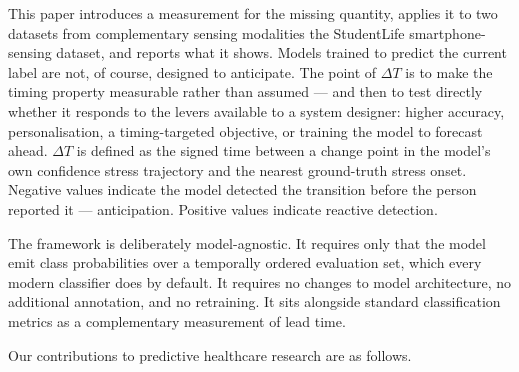 \documentclass[preprint,12pt,authoryear]{elsarticle}
\newcommand{\dt}{$\Delta T$}
\providecommand{\DIFaddtex}[1]{{\protect\color{blue} \sf #1}} %
\providecommand{\DIFdeltex}[1]{{\protect\color{red} \scriptsize #1}} %
\providecommand{\DIFaddbegin}{} %
\providecommand{\DIFaddend}{} %
\providecommand{\DIFdelbegin}{} %
\providecommand{\DIFdelend}{} %
\providecommand{\DIFadd}[1]{\texorpdfstring{\DIFaddtex{#1}}{#1}} %
\providecommand{\DIFdel}[1]{\texorpdfstring{\DIFdeltex{#1}}{}} %
\newcommand{\DIFscaledelfig}{0.5}
\newlength{\DIFdelgraphicswidth} %
\newlength{\DIFdelgraphicsheight} %
\newcommand{\DIFaddincludegraphics}[2][]{{\color{blue}\fbox{\DIFOincludegraphics[#1]{#2}}}} %
\newcommand{\DIFdelincludegraphics}[2][]{%
\sbox{\DIFdelgraphicsbox}{\DIFOincludegraphics[#1]{#2}}%
\settoboxwidth{\DIFdelgraphicswidth}{\DIFdelgraphicsbox} %
\settoboxtotalheight{\DIFdelgraphicsheight}{\DIFdelgraphicsbox} %
\scalebox{\DIFscaledelfig}{%
\parbox[b]{\DIFdelgraphicswidth}{\usebox{\DIFdelgraphicsbox}\\[-\baselineskip] \rule{\DIFdelgraphicswidth}{0em}}\llap{\resizebox{\DIFdelgraphicswidth}{\DIFdelgraphicsheight}{%
\setlength{\unitlength}{\DIFdelgraphicswidth}%
\begin{picture}(1,1)%
\thicklines\linethickness{2pt} %
{\color[rgb]{1,0,0}\put(0,0){\framebox(1,1){}}}%
{\color[rgb]{1,0,0}\put(0,0){\line( 1,1){1}}}%
{\color[rgb]{1,0,0}\put(0,1){\line(1,-1){1}}}%
\end{picture}%
}\hspace*{3pt}}} %
} %
\DeclareRobustCommand{\DIFaddbegin}{\DIFOaddbegin \let\includegraphics\DIFaddincludegraphics} %
\DeclareRobustCommand{\DIFaddend}{\DIFOaddend \let\includegraphics\DIFOincludegraphics} %
\DeclareRobustCommand{\DIFdelbegin}{\DIFOdelbegin \let\includegraphics\DIFdelincludegraphics} %
\DeclareRobustCommand{\DIFdelend}{\DIFOaddend \let\includegraphics\DIFOincludegraphics} %
\begin{document}
This paper introduces a measurement for the missing quantity, applies
it to \DIFdelbegin \DIFdel{two datasets from complementary sensing modalities}\DIFdelend \DIFaddbegin \DIFadd{the StudentLife smartphone-sensing dataset}\DIFaddend , and reports
what it shows. \DIFaddbegin \DIFadd{Models trained to predict the current label are not, of
course, designed to anticipate. The point of \dt{} is to make the
timing property measurable rather than assumed --- and then to test
directly whether it responds to the levers available to a system
designer: higher accuracy, personalisation, a timing-targeted
objective, or training the model to forecast ahead. }\DIFaddend \dt{} is defined as the signed time between a change
point in the model's own \DIFdelbegin \DIFdel{confidence }\DIFdelend \DIFaddbegin \DIFadd{stress }\DIFaddend trajectory and the nearest
ground-truth stress onset. Negative values indicate the model detected
the transition before the person reported it --- anticipation. Positive
values indicate reactive detection.

The framework is deliberately model-agnostic. It requires only that the
model emit class probabilities over a temporally ordered evaluation set,
which every modern classifier does by default. It requires no changes
to model architecture, no additional annotation, and no retraining. It
sits alongside standard classification metrics as a complementary
measurement of lead time.

Our contributions to predictive healthcare research are as follows.
\end{document}
